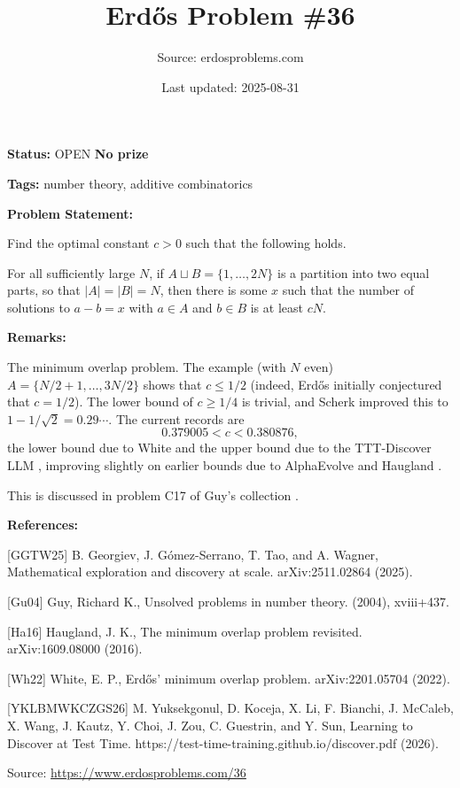 \documentclass{article}
\title{Erd\H{o}s Problem \#36}
\date{Last updated: 2025-08-31}
\author{Source: erdosproblems.com}
\begin{document}
\maketitle

\noindent\textbf{Status:} OPEN \quad \textbf{No prize}

\noindent\textbf{Tags:} number theory, additive combinatorics

\medskip
\noindent\textbf{Problem Statement:}

Find the optimal constant $c>0$ such that the following holds. 

For all sufficiently large $N$, if $A\sqcup B=\{1,\ldots,2N\}$ is a partition into two equal parts, so that $\lvert A\rvert=\lvert B\rvert=N$, then there is some $x$ such that the number of solutions to $a-b=x$ with $a\in A$ and $b\in B$ is at least $cN$.

\bigskip
\noindent\textbf{Remarks:}

The minimum overlap problem. The example (with $N$ even) $A=\{N/2+1,\ldots,3N/2\}$ shows that $c\leq 1/2$ (indeed, Erd\H{o}s initially conjectured that $c=1/2$). The lower bound of $c\geq 1/4$ is trivial, and Scherk improved this to $1-1/\sqrt{2}=0.29\cdots$. The current records are\[0.379005 < c < 0.380876,\]the lower bound due to White \cite{Wh22} and the upper bound due to the TTT-Discover LLM \cite{YKLBMWKCZGS26}, improving slightly on earlier bounds due to AlphaEvolve \cite{GGTW25} and Haugland \cite{Ha16}.

This is discussed in problem C17 of Guy's collection \cite{Gu04}.

\bigskip
\noindent\textbf{References:}

[GGTW25] B. Georgiev, J. G\'{o}mez-Serrano, T. Tao, and A. Wagner, Mathematical exploration and discovery at scale. arXiv:2511.02864 (2025).
 
 [Gu04] Guy, Richard K., Unsolved problems in number theory. (2004), xviii+437.
 
 [Ha16] Haugland, J. K., The minimum overlap problem revisited. arXiv:1609.08000 (2016).
 
 [Wh22] White, E. P., Erd\H{o}s' minimum overlap problem. arXiv:2201.05704 (2022).
 
 [YKLBMWKCZGS26] M. Yuksekgonul, D. Koceja, X. Li, F. Bianchi, J. McCaleb, X. Wang, J. Kautz, Y. Choi, J. Zou, C. Guestrin, and Y. Sun, Learning to Discover at Test Time. https://test-time-training.github.io/discover.pdf (2026).

\bigskip
\noindent\small{Source: \url{https://www.erdosproblems.com/36}}
\end{document}
